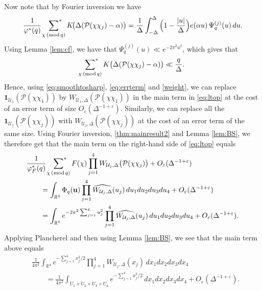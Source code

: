 \documentclass[12pt, reqno]{amsart}
\renewcommand{\pmod}[1]{\,(\mathrm{mod}\,#1)}
\newcommand{\acom}[1]{{\color{blue}{Alexandra: #1}} }
\numberwithin{equation}{section}
\numberwithin{theorem}{section}
\numberwithin{equation}{section}
\def\sumstar{\sideset{}{^*}\sum}
\begin{document}
Now note that by Fourier inversion we have
\[
\frac{1}{\varphi^*(q)}\ \sumstar_{\chi \pmod q}K\!\big(\Delta(\mathcal P(\chi\chi_j)-\alpha)\big)
=\frac1\Delta\int_{-\Delta}^{\Delta}\Big(1-\frac{|u|}{\Delta}\Big)e(\alpha u)\,\Psi_q^{(j)}(u)\,du .
\]
Using Lemma \ref{lem:cf}, we have that $\Psi_q^{(j)}(u) \ll e^{-2 \pi^2 u^2}$, which gives that 
\begin{equation} \label{eq:errterm}
\sumstar_{\chi \pmod q} K\big(\Delta (\mathcal P(\chi \chi_j)-\alpha)\big) \ll \frac{q}{\Delta}.
\end{equation}
Hence, using \eqref{eq:smoothtosharp},
\eqref{eq:errterm} and \eqref{weight}, we can replace $\mathbf{1}_{\mathcal U_1}(\mathcal P(\chi\chi_1))$ by $W_{\mathcal U_1,\Delta}(\mathcal P(\chi\chi_1))$ in the main term in \eqref{eq:ltop} at the cost of an error term of size $O_\varepsilon(\Delta^{-1+\varepsilon})$. %
Similarly, we can replace all the $\mathbf{1}_{\mathcal U_j}(\mathcal P(\chi\chi_j))$ with $W_{\mathcal U_j,\Delta}(\mathcal P(\chi\chi_j))$ at the cost of an error term of the same size. Using Fourier inversion, \eqref{thm:mainresult2} and Lemma \ref{lem:BS}, we therefore get that the main term on the right-hand side of \eqref{eq:ltop} equals
\begin{equation}  \notag
\begin{split}
&\frac{1}{\varphi_F^{*}(q)}\ \sumstar_{\chi \pmod q} F(\chi)\prod_{j=1}^{4} W_{\mathcal U_j,\Delta}\big(\mathcal P(\chi\chi_j)\big)+O_\varepsilon(\Delta^{-1+\varepsilon})\\
&\qquad= \int_{\mathbb R^4} \Phi_q(\textbf{u})\prod_{j=1}^{4} \widehat {W_{\mathcal U_j, \Delta}}(u_j)  \, du_1du_2du_3du_4 +O_\varepsilon(\Delta^{-1+\varepsilon})\\
&\qquad = \int_{\mathbb R^4} e^{-2\pi^2\sum_{j=1}^4 u_j^2}\prod_{j=1}^{4} \widehat {W_{\mathcal U_j, \Delta}}(u_j) \, du_1du_2du_3du_4+O_\varepsilon(\Delta^{-1+\varepsilon}).
\end{split}
\end{equation}
Applying Plancherel and then using Lemma \ref{lem:BS}, we see that the main term above equals
\begin{align}\label{finale}
&\frac{1}{4\pi^2} \int_{\mathbb R^4} e^{-\sum_{j=1}^{4}x_j^2/2}\prod_{j=1}^{4} W_{\mathcal U_j,\Delta}(x_j) \, dx_1dx_2dx_3dx_4\nonumber\\
&\qquad = \frac{1}{4\pi^2} \int_{U_1 \times U_2\times U_3\times U_4} e^{-\sum_{j=1}^{4}x_j^2/2} \, dx_1dx_2dx_3dx_4+O_\varepsilon(\Delta^{-1+\varepsilon}).
\end{align}
\end{document}
